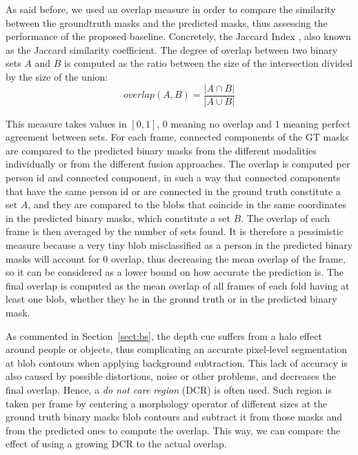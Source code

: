 \documentclass[10pt,twocolumn,letterpaper]{article}
\begin{document}

As said before, we used an overlap measure in order to compare the similarity between the groundtruth masks and the predicted masks, thus assessing the performance of the proposed baseline. Concretely, the Jaccard Index \cite{tan2002selecting}, also known as the Jaccard similarity coefficient. The degree of overlap between two binary sets $A$ and $B$ is computed as the ratio between the size of the intersection divided by the size of the union:
\begin{equation} \label{eq:jaccard}
overlap(A, B) = \frac{|A \cap B|}{|A \cup B|}
\end{equation}

This measure takes values in $[0,1]$, 0 meaning no overlap and 1 meaning perfect agreement between sets. For each frame, connected components of the GT masks are compared to the predicted binary masks from the different modalities individually or from the different fusion approaches. The overlap is computed per person id and connected component, in such a way that connected components that have the same person id or are connected in the ground truth constitute a set $A$, and they are compared to the blobs that coincide in the same coordinates in the predicted binary masks, which constitute a set $B$. The overlap of each frame is then averaged by the number of sets found. It is therefore a pessimistic measure because a very tiny blob misclassified as a person in the predicted binary masks will account for 0 overlap, thus decreasing the mean overlap of the frame, so it can be considered as a lower bound on how accurate the prediction is. The final overlap is computed as the mean overlap of all frames of each fold having at least one blob, whether they be in the ground truth or in the predicted binary mask.

As commented in Section~\ref{sect:bs}, the depth cue suffers from a halo effect around people or objects, thus complicating an accurate pixel-level segmentation at blob contours when applying background subtraction. This lack of accuracy is also caused by possible distortions, noise or other problems, and decreases the final overlap. Hence, a \emph{do not care region} (DCR) is often used. Such region is taken per frame by centering a morphology operator of different sizes at the ground truth binary masks blob contours and subtract it from those masks and from the predicted ones to compute the overlap. This way, we can compare the effect of using a growing DCR to the actual overlap.
\end{document}
